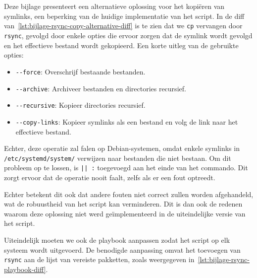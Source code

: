 
\chapter{}
\label{ch:bijlage_symlink_kopieren_met_rsync}

Deze bijlage presenteert een alternatieve oplossing voor het kopi\"eren van symlinks, een beperking van de huidige implementatie van het script.
In de diff van~\ref{lst:bijlage-rsync-copy-alternative-diff} is te zien dat we \texttt{cp} vervangen door \texttt{rsync}, gevolgd door enkele opties die ervoor zorgen dat de symlink wordt gevolgd en het effectieve bestand wordt gekopieerd.
Een korte uitleg van de gebruikte opties:

\begin{itemize}
  \item \texttt{-{}-force}: Overschrijf bestaande bestanden.
  \item \texttt{-{}-archive}: Archiveer bestanden en directories recursief.
  \item \texttt{-{}-recursive}: Kopieer directories recursief.
  \item \texttt{-{}-copy-links}: Kopieer symlinks als een bestand en volg de link naar het effectieve bestand.
\end{itemize}

Echter, deze operatie zal falen op Debian-systemen, omdat enkele symlinks in\\ \texttt{/etc/systemd/system/} verwijzen naar bestanden die niet bestaan.
Om dit probleem op te lossen, is \texttt{|| :} toegevoegd aan het einde van het commando.
Dit zorgt ervoor dat de operatie nooit faalt, zelfs als er een fout optreedt.

Echter betekent dit ook dat andere fouten niet correct zullen worden afgehandeld, wat de robuustheid van het script kan verminderen.
Dit is dan ook de redenen waarom deze oplossing niet werd ge\"implementeerd in de uiteindelijke versie van het script.

Uiteindelijk moeten we ook de playbook aanpassen zodat het script op elk systeem wordt uitgevoerd.
De benodigde aanpassing omvat het toevoegen van \texttt{rsync} aan de lijst van vereiste pakketten, zoals weergegeven in~\ref{lst:bijlage-rsync-playbook-diff}.

